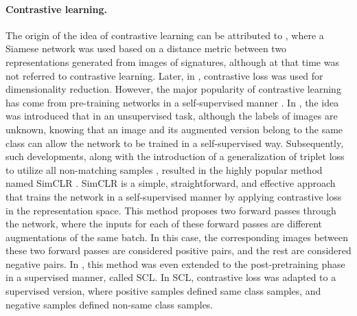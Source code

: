 \paragraph{Contrastive learning.} The origin of the idea of contrastive learning can be attributed to \cite{Bromley1993SignatureVU}, where a Siamese network was used based on a distance metric between two representations generated from images of signatures, although at that time was not referred to contrastive learning. Later, in \cite{hadsell2006dimensionality}, contrastive loss was used for dimensionality reduction. However, the major popularity of contrastive learning has come from pre-training networks in a self-supervised manner \cite{chen2020simple, he2020momentum, chen2020improved, radford2021learning}. In \cite{NIPS2014_07563a3f, xie2020unsupervised}, the idea was introduced that in an unsupervised task, although the labels of images are unknown, knowing that an image and its augmented version belong to the same class can allow the network to be trained in a self-supervised way. Subsequently, such developments, along with the introduction of a generalization of triplet loss \cite{schroff2015facenet} to utilize all non-matching samples \cite{sohn2016improved}, resulted in the highly popular method named SimCLR \cite{chen2020simple}. SimCLR is a simple, straightforward, and effective approach that trains the network in a self-supervised manner by applying contrastive loss in the representation space. This method proposes two forward passes through the network, where the inputs for each of these forward passes are different augmentations of the same batch. In this case, the corresponding images between these two forward passes are considered positive pairs, and the rest are considered negative pairs. In \cite{khosla2020supervised}, this method was even extended to the post-pretraining phase in a supervised manner, called SCL. In SCL, contrastive loss was adapted to a supervised version, where positive samples defined same class samples, and negative samples defined non-same class samples.
